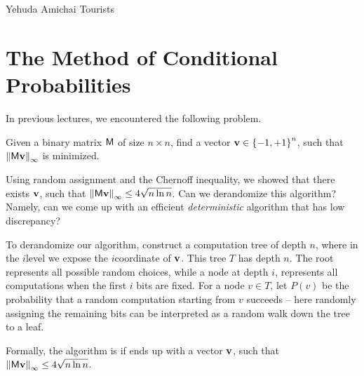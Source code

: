 %

\ChapterPrefix{}
\ChapterGen{}


%
{Yehuda Amichai}%
{Tourists}

\section{The Method of Conditional Probabilities}

In previous lectures, we encountered the following problem.

\begin{problem}
    Given a binary matrix $\mathsf{M}$ of size $n \times n$, find a
    vector $\mathbf{v} \in \left\{ {-1,+1} \right\}^n$, such that
    $\left\| {\mathsf{M} \mathbf{v}} \right\|_\infty$ is minimized.
\end{problem}

Using random assignment and the Chernoff inequality, we showed that
there exists $\mathbf{v}$, such that
$\left\| {\mathsf{M} \mathbf{v}} \right\|_\infty \leq 4 \sqrt{ n\ln n}$. Can we
derandomize this algorithm?  Namely, can we come up with an efficient
\emph{deterministic} algorithm that has low discrepancy?

To derandomize our algorithm, construct a computation tree of depth
$n$, where in the $i$\th level we expose the $i$\th coordinate of
$\mathbf{v}$.  This tree $T$ has depth $n$. The root represents all
possible random choices, while a node at depth $i$, represents all
computations when the first $i$ bits are fixed. For a node $v \in T$,
let $P(v)$ be the probability that a random computation starting from
$v$ succeeds -- here randomly assigning the remaining bits can be
interpreted as a random walk down the tree to a leaf.

Formally, the algorithm is  if ends up with a vector
$\mathbf{v}$, such that
$\left\| {\mathsf{M} \mathbf{v}} \right\|_\infty \leq 4 \sqrt{ n\ln n}$.

